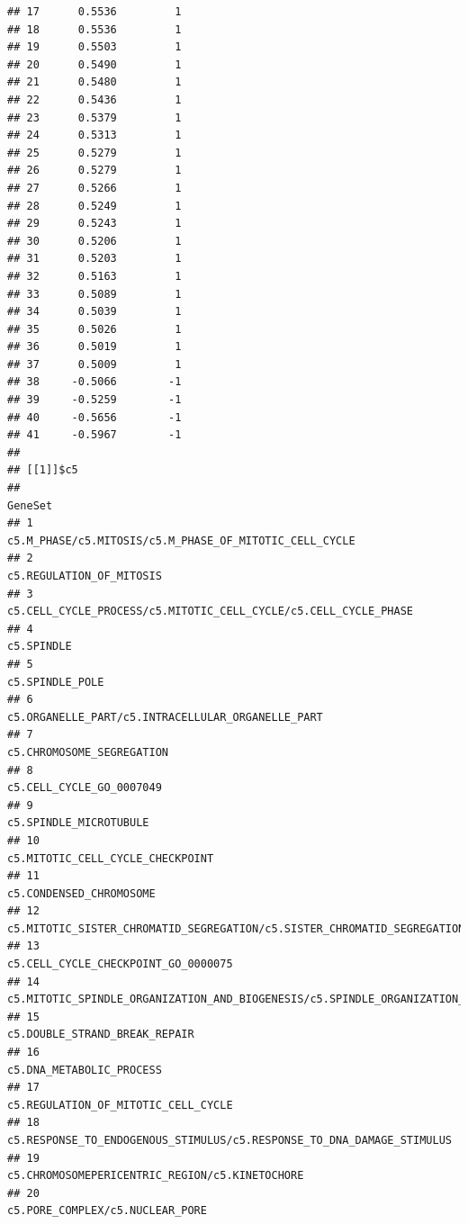 \documentclass{article}\usepackage[]{graphicx}\usepackage[]{color}
\makeatletter
\newenvironment{kframe}{%
 \def\at@end@of@kframe{}%
 \ifinner\ifhmode%
  \def\at@end@of@kframe{\end{minipage}}%
  \begin{minipage}{\columnwidth}%
 \fi\fi%
 \def\FrameCommand##1{\hskip\@totalleftmargin \hskip-\fboxsep
 \colorbox{shadecolor}{##1}\hskip-\fboxsep
     \hskip-\linewidth \hskip-\@totalleftmargin \hskip\columnwidth}%
 \MakeFramed {\advance\hsize-\width
   \@totalleftmargin\z@ \linewidth\hsize
   \@setminipage}}%
 {\par\unskip\endMakeFramed%
 \at@end@of@kframe}
\newenvironment{knitrout}{}{} %
\makeatother
\begin{document}
\begin{knitrout}
\begin{kframe}
\begin{verbatim}
## 17      0.5536         1
## 18      0.5536         1
## 19      0.5503         1
## 20      0.5490         1
## 21      0.5480         1
## 22      0.5436         1
## 23      0.5379         1
## 24      0.5313         1
## 25      0.5279         1
## 26      0.5279         1
## 27      0.5266         1
## 28      0.5249         1
## 29      0.5243         1
## 30      0.5206         1
## 31      0.5203         1
## 32      0.5163         1
## 33      0.5089         1
## 34      0.5039         1
## 35      0.5026         1
## 36      0.5019         1
## 37      0.5009         1
## 38     -0.5066        -1
## 39     -0.5259        -1
## 40     -0.5656        -1
## 41     -0.5967        -1
## 
## [[1]]$c5
##                                                                                  GeneSet
## 1                                 c5.M_PHASE/c5.MITOSIS/c5.M_PHASE_OF_MITOTIC_CELL_CYCLE
## 2                                                               c5.REGULATION_OF_MITOSIS
## 3                        c5.CELL_CYCLE_PROCESS/c5.MITOTIC_CELL_CYCLE/c5.CELL_CYCLE_PHASE
## 4                                                                             c5.SPINDLE
## 5                                                                        c5.SPINDLE_POLE
## 6                                      c5.ORGANELLE_PART/c5.INTRACELLULAR_ORGANELLE_PART
## 7                                                              c5.CHROMOSOME_SEGREGATION
## 8                                                               c5.CELL_CYCLE_GO_0007049
## 9                                                                 c5.SPINDLE_MICROTUBULE
## 10                                                      c5.MITOTIC_CELL_CYCLE_CHECKPOINT
## 11                                                               c5.CONDENSED_CHROMOSOME
## 12               c5.MITOTIC_SISTER_CHROMATID_SEGREGATION/c5.SISTER_CHROMATID_SEGREGATION
## 13                                                   c5.CELL_CYCLE_CHECKPOINT_GO_0000075
## 14 c5.MITOTIC_SPINDLE_ORGANIZATION_AND_BIOGENESIS/c5.SPINDLE_ORGANIZATION_AND_BIOGENESIS
## 15                                                         c5.DOUBLE_STRAND_BREAK_REPAIR
## 16                                                              c5.DNA_METABOLIC_PROCESS
## 17                                                   c5.REGULATION_OF_MITOTIC_CELL_CYCLE
## 18                 c5.RESPONSE_TO_ENDOGENOUS_STIMULUS/c5.RESPONSE_TO_DNA_DAMAGE_STIMULUS
## 19                                        c5.CHROMOSOMEPERICENTRIC_REGION/c5.KINETOCHORE
## 20                                                       c5.PORE_COMPLEX/c5.NUCLEAR_PORE

\end{verbatim}
\end{kframe}
\end{knitrout}
\end{document}
